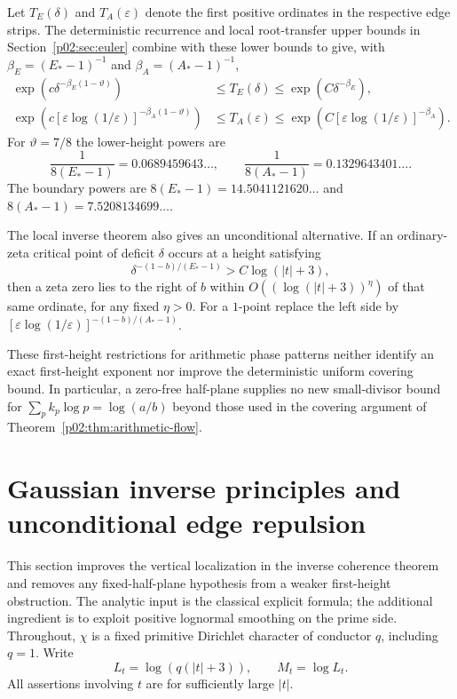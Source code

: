 \documentclass[11pt,letterpaper]{article}
\theoremstyle{definition}
\theoremstyle{remark}
\newcommand{\eps}{\varepsilon}
\newcommand{\1}{\mathbf 1}
\begin{document}
Let $T_E(\delta)$ and $T_A(\eps)$ denote the first positive ordinates
in the respective edge strips. The deterministic recurrence and local
root-transfer upper bounds in Section~\ref{p02:sec:euler} combine with these lower bounds
to give, with $\beta_E=(E_*-1)^{-1}$ and $\beta_A=(A_*-1)^{-1}$,
\begin{align}
 \exp(c\delta^{-\beta_E(1-\vartheta)})
 &\le T_E(\delta)\le\exp(C\delta^{-\beta_E}),
 \label{p03:eq:critical-first-height-bracket}\\
 \exp\!\left(c[\eps\log(1/\eps)]^{-\beta_A(1-\vartheta)}\right)
 &\le T_A(\eps)\le
 \exp\!\left(C[\eps\log(1/\eps)]^{-\beta_A}\right).
 \label{p03:eq:one-first-height-bracket}
\end{align}
For $\vartheta=7/8$ the lower-height powers are
\[
 \frac1{8(E_*-1)}=0.0689459643\ldots,\qquad
 \frac1{8(A_*-1)}=0.1329643401\ldots.
\]
The boundary powers are $8(E_*-1)=14.5041121620\ldots$ and
$8(A_*-1)=7.5208134699\ldots$.

The local inverse theorem also gives an unconditional alternative.
If an ordinary-zeta critical point of deficit $\delta$ occurs at a
height satisfying
\[
 \delta^{-(1-b)/(E_*-1)}>C\log(|t|+3),
\]
then a zeta zero lies to the right of $b$ within
$O((\log(|t|+3))^\eta)$ of that same ordinate, for any fixed
$\eta>0$. For a $1$-point replace the left side by
$[\eps\log(1/\eps)]^{-(1-b)/(A_*-1)}$.

These first-height restrictions for arithmetic phase patterns neither
identify an exact first-height exponent nor improve the deterministic
uniform covering bound. In particular, a zero-free half-plane supplies
no new small-divisor bound for $\sum_pk_p\log p=\log(a/b)$ beyond
those used in the covering argument of Theorem~\ref{p02:thm:arithmetic-flow}.




\section{Gaussian inverse principles and unconditional edge repulsion}
\label{p04:sec:zi-gaussian}

This section improves the vertical localization in the inverse
coherence theorem and removes any fixed-half-plane hypothesis from a
weaker first-height obstruction.  The analytic input is the classical
explicit formula; the additional ingredient is to exploit positive
lognormal smoothing on the prime side.  Throughout, $\chi$ is a fixed
primitive Dirichlet character of conductor $q$, including $q=1$.
Write
\[
 L_t=\log(q(|t|+3)),\qquad M_t=\log L_t.
\]
All assertions involving $t$ are for sufficiently large $|t|$.
\end{document}
